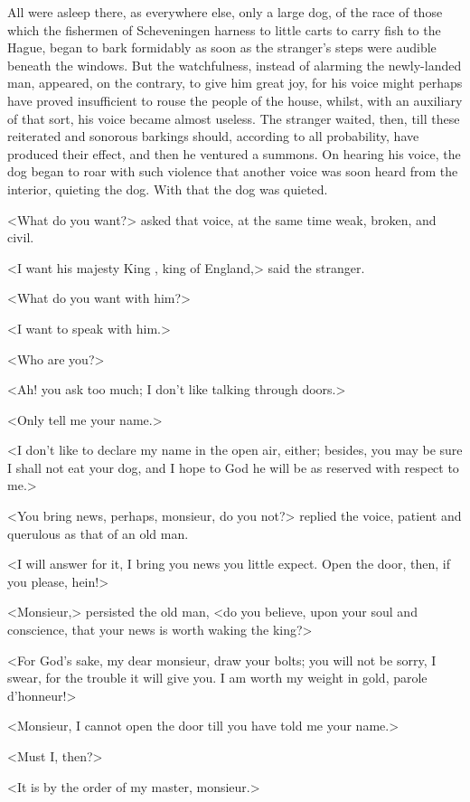 All were asleep there, as everywhere else, only a large dog, of the race of those which the fishermen of Scheveningen harness to little carts to carry fish to the Hague, began to bark formidably as soon as the stranger's steps were audible beneath the windows. But the watchfulness, instead of alarming the newly-landed man, appeared, on the contrary, to give him great joy, for his voice might perhaps have proved insufficient to rouse the people of the house, whilst, with an auxiliary of that sort, his voice became almost useless. The stranger waited, then, till these reiterated and sonorous barkings should, according to all probability, have produced their effect, and then he ventured a summons. On hearing his voice, the dog began to roar with such violence that another voice was soon heard from the interior, quieting the dog. With that the dog was quieted.

<What do you want?> asked that voice, at the same time weak, broken, and civil.

<I want his majesty King , king of England,> said the stranger.

<What do you want with him?>

<I want to speak with him.>

<Who are you?>

<Ah!  you ask too much; I don't like talking through doors.>

<Only tell me your name.>

<I don't like to declare my name in the open air, either; besides, you may be sure I shall not eat your dog, and I hope to God he will be as reserved with respect to me.>

<You bring news, perhaps, monsieur, do you not?> replied the voice, patient and querulous as that of an old man.

<I will answer for it, I bring you news you little expect. Open the door, then, if you please, hein!>

<Monsieur,> persisted the old man, <do you believe, upon your soul and conscience, that your news is worth waking the king?>

<For God's sake, my dear monsieur, draw your bolts; you will not be sorry, I swear, for the trouble it will give you. I am worth my weight in gold, parole d'honneur!>

<Monsieur, I cannot open the door till you have told me your name.>

<Must I, then?>

<It is by the order of my master, monsieur.>

